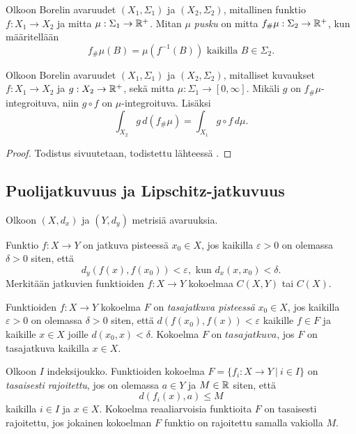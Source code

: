 \documentclass[12pt,oneside,a4paper]{amsbook} %
\begin{document}
\begin{definition}
    Olkoon Borelin avaruudet $(X_1, \Sigma_1)$ ja $(X_2, \Sigma_2)$, mitallinen funktio $f:X_1 \to X_2$ ja mitta $\mu: \Sigma_1 \to \mathbb{R}^+$. Mitan $\mu$ \textit{pusku} on mitta $f_\#\mu: \Sigma_2 \to \mathbb{R}^+$, kun määritellään
    $$f_\# \mu (B) = \mu(f^{-1}(B)) \text{ kaikilla } B\in \Sigma_2.$$
\end{definition}

\begin{theorem}\label{thm:push-cov}
    Olkoon Borelin avaruudet $(X_1, \Sigma_1)$ ja $(X_2, \Sigma_2)$, mitalliset kuvaukset $f: X_1 \to X_2$ ja $g: X_2 \to \mathbb{R}^+$, sekä mitta $\mu:\Sigma_1 \to [0, \infty]$. Mikäli $g$ on $f_\#\mu$-integroituva, niin  $g \circ f$ on $\mu$-integroituva. Lisäksi
    \begin{equation*}
        \int_{X_2} g \, d(f_{\#} \mu) = \int_{X_1} g \circ f \, d\mu.
    \end{equation*}
\end{theorem}
\begin{proof}
Todistus sivuutetaan, todistettu lähteessä \cite[s. 190]{bogachev}.
\end{proof}

\subsection{Puolijatkuvuus ja Lipschitz-jatkuvuus}
Olkoon $(X, d_x)$ ja $(Y, d_y)$ metrisiä avaruuksia.

\begin{definition}Funktio $f: X \to Y$ on jatkuva pisteessä $x_0 \in X$, jos kaikilla $\varepsilon > 0$ on olemassa $\delta > 0$ siten, että
\begin{equation*}
    d_y(f(x), f(x_0)) < \varepsilon, \text{ kun } d_x(x, x_0) < \delta.
\end{equation*}
Merkitään jatkuvien funktioiden $f: X \to Y$ kokoelmaa $C(X, Y)$ tai $C(X)$.
\end{definition}

\begin{definition}
Funktioiden $f:X \to Y$ kokoelma $F$ on \textit{tasajatkuva pisteessä} $x_0 \in X$, jos kaikilla $\varepsilon > 0 $ on olemassa $\delta > 0$ siten, että $d(f(x_0), f(x)) < \varepsilon$ kaikille $f \in F$ ja kaikille $x \in X$ joille $d(x_0, x) < \delta $. Kokoelma $F$ on $tasajatkuva$, jos $F$ on tasajatkuva kaikilla $x \in X$.
\end{definition}

\begin{definition}
    Olkoon $I$ indeksijoukko. Funktioiden kokoelma $F = \{f_i : X \to Y \ | \ i \in I\}$ on \textit{tasaisesti rajoitettu}, jos on olemassa $a \in Y$ ja $M \in \mathbb{R}$ siten, että
    \begin{equation*}
        d(f_i(x), a) \le M
    \end{equation*} 
    kaikilla $i \in I$ ja $x \in X$.
    Kokoelma reaaliarvoisia funktioita $F$ on tasaisesti rajoitettu, jos jokainen kokoelman $F$ funktio on rajoitettu samalla vakiolla $M$.
\end{definition}
\end{document}
